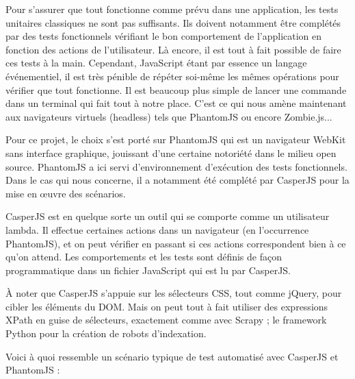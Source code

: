 \documentclass[a4paper,12pt]{article}
\begin{document}
Pour s'assurer que tout fonctionne comme prévu dans une application, les tests unitaires classiques ne sont pas suffisants. Ils doivent notamment être complétés par des tests fonctionnels vérifiant le bon comportement de l'application en fonction des actions de l'utilisateur. Là encore, il est tout à fait possible de faire ces tests à la main. Cependant, JavaScript étant par essence un langage événementiel, il est très pénible de répéter soi-même les mêmes opérations pour vérifier que tout fonctionne. Il est beaucoup plus simple de lancer une commande dans un terminal qui fait tout à notre place. C'est ce qui nous amène maintenant aux navigateurs virtuels (headless) tels que PhantomJS ou encore Zombie.js...

Pour ce projet, le choix s'est porté sur PhantomJS qui est un navigateur WebKit sans interface graphique, jouissant d'une certaine notoriété dans le milieu open source. PhantomJS a ici servi d'environnement d'exécution des tests fonctionnels. Dans le cas qui nous concerne, il a notamment été complété par CasperJS pour la mise en œuvre des scénarios.

CasperJS est en quelque sorte un outil qui se comporte comme un utilisateur lambda. Il effectue certaines actions dans un navigateur (en l'occurrence PhantomJS), et on peut vérifier en passant si ces actions correspondent bien à ce qu'on attend. Les comportements et les tests sont définis de façon programmatique dans un fichier JavaScript qui est lu par CasperJS.

À noter que CasperJS s'appuie sur les sélecteurs CSS, tout comme jQuery, pour cibler les éléments du DOM. Mais on peut tout à fait utiliser des expressions XPath en guise de sélecteurs, exactement comme avec Scrapy ; le framework Python pour la création de robots d'indexation.

Voici à quoi ressemble un scénario typique de test automatisé avec CasperJS et PhantomJS :

\newpage
\end{document}
